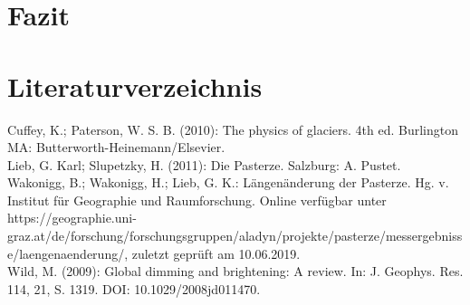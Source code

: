 \documentclass[12pt,a4paper]{article}
\begin{document}
\pagebreak
\section{Fazit}


\section{Literaturverzeichnis}
Cuffey, K.; Paterson, W. S. B. (2010): The physics of glaciers. 4th ed. Burlington MA: Butterworth-Heinemann/Elsevier.\\

Lieb, G. Karl; Slupetzky, H. (2011): Die Pasterze. Salzburg: A. Pustet.\\

Wakonigg, B.; Wakonigg, H.; Lieb, G. K.: Längenänderung der Pasterze. Hg. v. Institut für Geographie und Raumforschung. Online verfügbar unter https://geographie.uni-graz.at/de/forschung/forschungsgruppen/aladyn/projekte/pasterze/messergebnisse/laengenaenderung/, zuletzt geprüft am 10.06.2019.\\

Wild, M. (2009): Global dimming and brightening: A review. In: J. Geophys. Res. 114, 21, S. 1319. DOI: 10.1029/2008jd011470.
\end{document}
